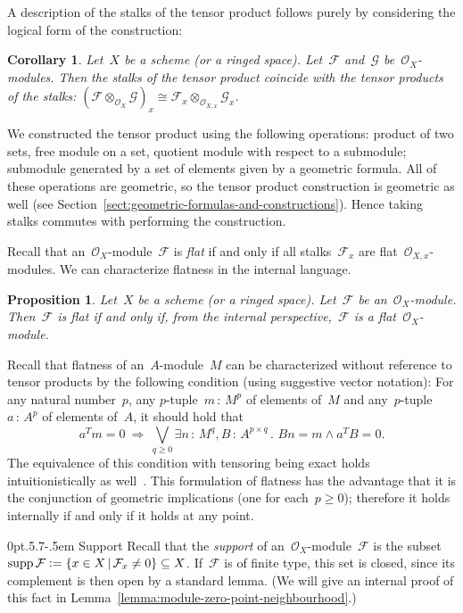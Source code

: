 \documentclass[10pt,reqno,a4paper]{amsbook}
\makeatletter
\theoremstyle{definition}
\theoremstyle{plain}
\newtheorem{prop}[defn]{Proposition}
\newtheorem{cor}[defn]{Corollary}
\theoremstyle{remark}
\newcommand{\F}{\mathcal{F}}
\newcommand{\G}{\mathcal{G}}
\renewcommand{\O}{\mathcal{O}}
\DeclareMathOperator{\supp}{supp}
\newcommand{\?}{\,{:}\,}
\renewcommand{\_}{\mathpunct{.}\,}
\newcommand{\defeq}{\vcentcolon=}
\renewenvironment{proof}[1][\proofname]{\par
  \pushQED{\qed}%
  \normalfont \topsep6\p@\@plus6\p@\relax
  \trivlist
  \item[\hskip\labelsep
        \itshape
    #1\@addpunct{.}]\ignorespaces
}{%
  \popQED\endtrivlist\@endpefalse
}
\def\subsection{\@startsection{subsection}{2}%
  {0pt}{.5\linespacing\@plus.7\linespacing}{-.5em}%
  {\normalfont\bfseries}}
\makeatother
\begin{document}
A description of the stalks of the tensor product
follows purely by considering the logical form of the construction:
\begin{cor}Let~$X$ be a scheme (or a ringed space). Let~$\F$ and~$\G$
be~$\O_X$-modules. Then the stalks of the tensor product coincide with the
tensor products of the stalks: $(\F \otimes_{\O_X} \G)_x \cong \F_x
\otimes_{\O_{X,x}} \G_x$.\end{cor}
\begin{proof}
We constructed the tensor product using the following operations: product of
two sets, free module on a set, quotient module with respect to a submodule;
submodule generated by a set of elements given by a geometric formula.
All of these operations are geometric, so the tensor product construction is
geometric as well (see Section~\ref{sect:geometric-formulas-and-constructions}). Hence taking stalks commutes with performing the
construction.
\end{proof}

Recall that an~$\O_X$-module~$\F$ is \emph{flat} if and only if all
stalks~$\F_x$ are flat~$\O_{X,x}$-modules. We can characterize flatness in the
internal language.
\begin{prop}\label{prop:flatness}
Let~$X$ be a scheme (or a ringed space). Let~$\F$ be
an~$\O_X$-module. Then~$\F$ is flat if and only if, from the internal
perspective,~$\F$ is a flat~$\O_X$-module.
\end{prop}
\begin{proof}
Recall that flatness of an~$A$-module~$M$ can be characterized without
reference to tensor products by the following condition (using
suggestive vector notation): For any natural number~$p$,
any $p$-tuple~$m \? M^p$ of elements of~$M$ and
any~$p$-tuple $a \? A^p$ of elements of~$A$, it should hold that
\[
  a^T m = 0 \ \Longrightarrow\
  \bigvee\limits_{q \geq 0} \exists n\?M^q, B\?A^{p \times q}\_
  Bn = m \wedge a^T B = 0. \]
The equivalence of this condition with tensoring being exact holds
intuitionistically as
well~\cite[Theorem~III.5.3]{mines-richman-ruitenburg:constructive-algebra}.
This formulation of flatness has the advantage that it is the conjunction of
geometric implications (one for each~$p \geq 0$); therefore it holds internally
if and only if it holds at any point.
\end{proof}


\subsection{Support} Recall that the \emph{support} of an~$\O_X$-module~$\F$ is
the subset~$\supp\F \defeq \{ x \in X \,|\, \F_x \neq 0 \} \subseteq X$. If~$\F$ is
of finite type, this set is closed, since its complement is then open by a
standard lemma. (We will give an internal proof of this fact in
Lemma~\ref{lemma:module-zero-point-neighbourhood}.)
\end{document}
